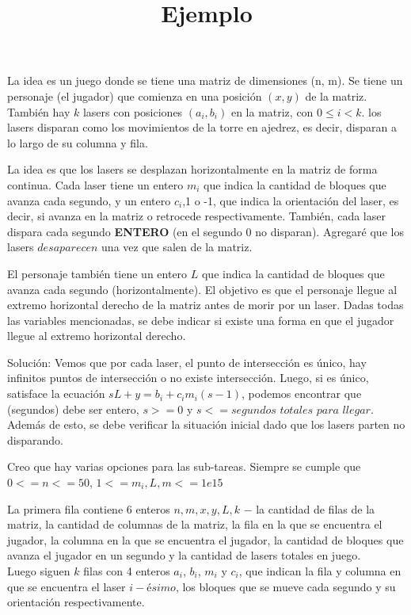 \documentclass{oci}
\title{Ejemplo}
\begin{document}
\begin{problemDescription}
La idea es un juego donde se tiene una matriz de dimensiones (n, m). Se tiene un personaje (el jugador) que comienza en una posición $(x, y)$ de la matriz. También hay $k$ lasers con posiciones $(a_i, b_i)$ en la matriz, con $0\leq i<k$. los lasers disparan como los movimientos de la torre en ajedrez, es decir, disparan a lo largo de su columna y fila.

La idea es que los lasers se desplazan horizontalmente en la matriz de forma continua. Cada laser tiene un entero $m_i$ que indica la cantidad de bloques que avanza cada segundo, y un entero $c_i$,1 o -1, que indica la orientación del laser, es decir, si avanza en la matriz o retrocede respectivamente. También, cada laser dispara cada segundo \textbf{ENTERO} (en el segundo 0 no disparan). Agregaré que los lasers $desaparecen$ una vez que salen de la matriz.

El personaje también tiene un entero $L$ que indica la cantidad de bloques que avanza cada segundo (horizontalmente). El objetivo es que el personaje llegue al extremo horizontal derecho de la matriz antes de morir por un laser. Dadas todas las variables mencionadas, se debe indicar si existe una forma en que el jugador llegue al extremo horizontal derecho.

Solución: Vemos que por cada laser, el punto de intersección es único, hay infinitos puntos de intersección o no existe intersección. Luego, si es único, satisface la ecuación $sL+y=b_i+c_im_i(s-1)$, podemos encontrar que (segundos) debe ser entero, $s>=0$ y $s<=segundos$ $totales$ $para$ $llegar$. Además de esto, se debe verificar la situación inicial dado que los lasers parten no disparando. 

Creo que hay varias opciones para las sub-tareas. Siempre se cumple que $0<=n<=50$, $1<=m_i, L, m<=1e15$
\end{problemDescription}

\begin{inputDescription}
La primera fila contiene 6 enteros $n, m, x, y, L, k$ $-$ la cantidad de filas de la matriz, la cantidad de columnas de la matriz, la fila en la que se encuentra el jugador, la columna en la que se encuentra el jugador, la cantidad de bloques que avanza el jugador en un segundo y la cantidad de lasers totales en juego.\\
Luego siguen $k$ filas con 4 enteros $a_i$, $b_i$, $m_i$ y $c_i$, que indican la fila y columna en que se encuentra el laser $i-ésimo$, los bloques que se mueve cada segundo y su orientación respectivamente.
\end{inputDescription}
\end{document}
